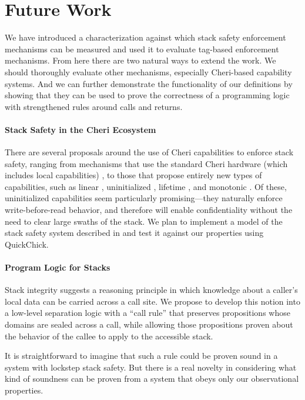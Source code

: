 \documentclass[acmsmall,review,anonymous]{acmart}\settopmatter{printfolios=true,printccs=false,printacmref=false}
\begin{document}
{\section{Future Work}
\label{sec:future}

We have introduced a characterization against which stack safety enforcement
mechanisms can be measured and used it to evaluate tag-based enforcement mechanisms.
From here there are two natural ways to extend the work. We should thoroughly evaluate
other mechanisms, especially Cheri-based capability systems. And we can further demonstrate
the functionality of our definitions by showing that they can be used to prove
the correctness of a programming logic with strengthened rules around calls and returns.

\paragraph*{Stack Safety in the Cheri Ecosystem}

There are several proposals around the use of Cheri capabilities to enforce stack safety,
ranging from mechanisms that use the standard Cheri hardware (which includes local
capabilities) \citep{SkorstengaardLocal},
to those that propose entirely new types of capabilities, such as linear
\citep{SkorstengaardSTK}, uninitialized \citep{Georges+21}, lifetime \citep{Tsampas+19}, and monotonic \citep{GeorgesComplete}.
Of these, uninitialized capabilities seem particularly promising---they naturally enforce
write-before-read behavior, and therefore will enable confidentiality without the need
to clear large swaths of the stack. We plan to implement a model of the stack safety
system described in \citet{Georges+21} and test it against our properties using
QuickChick.

\paragraph*{Program Logic for Stacks}

Stack integrity suggests a reasoning principle in which knowledge about a caller's
local data can be carried across a call site. We propose to develop this notion
into a low-level separation logic with a ``call rule'' that preserves propositions
whose domains are sealed across a call, while allowing those propositions proven
about the behavior of the callee to apply to the accessible stack.

It is straightforward to imagine that such a rule could be proven sound in a
system with lockstep stack safety. But there is a real novelty in considering
what kind of soundness can be proven from a system that obeys only our observational
properties.

}
\end{document}
